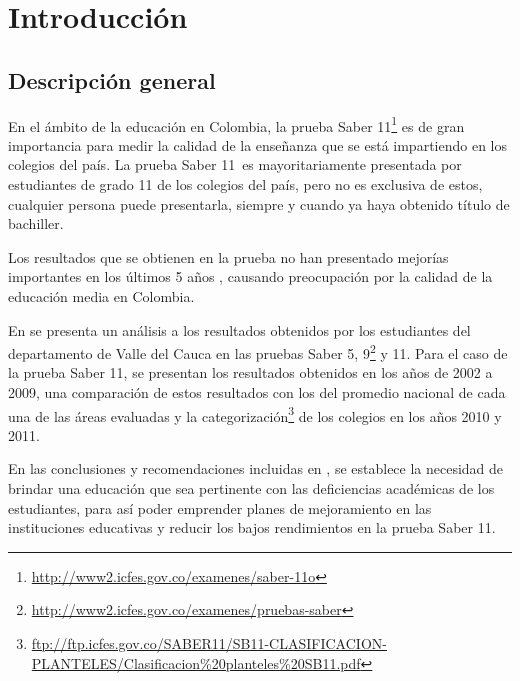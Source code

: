 \setcounter{page}{13}
\chapter{Introducción}
\section{Descripción general}
En el ámbito de la educación en Colombia, la prueba Saber 11\degree\footnote{\url{http://www2.icfes.gov.co/examenes/saber-11o}} es de gran importancia para medir la calidad de la enseñanza que se está impartiendo en los colegios del país. La prueba Saber 11\degree \ es mayoritariamente presentada por estudiantes de grado 11 de los colegios del país, pero no es exclusiva de estos, cualquier persona puede presentarla, siempre y cuando ya haya obtenido título de bachiller.

Los resultados que se obtienen en la prueba no han presentado mejorías importantes en los últimos 5 años \cite{key-1, key-2, key-3, key-4}, causando preocupación por la calidad de la educación media en Colombia.

En \cite{key-4} se presenta un análisis a los resultados obtenidos por los estudiantes del departamento de Valle del Cauca en las pruebas Saber 5\degree, 9\degree\footnote{\url{http://www2.icfes.gov.co/examenes/pruebas-saber}} y 11\degree. Para el caso de la prueba Saber 11\degree, se presentan los resultados obtenidos en los años de 2002 a 2009, una comparación de estos resultados con los del promedio nacional de cada una de las áreas evaluadas y la categorización\footnote{\url{ftp://ftp.icfes.gov.co/SABER11/SB11-CLASIFICACION-PLANTELES/Clasificacion\%20planteles\%20SB11.pdf}} de los colegios en los años 2010 y 2011.

En las conclusiones y recomendaciones incluidas en \cite{key-4}, se establece la necesidad de brindar una educación que sea pertinente con las deficiencias académicas de los estudiantes, para así poder emprender planes de mejoramiento en las instituciones educativas y reducir los bajos rendimientos en la prueba Saber 11\degree.

